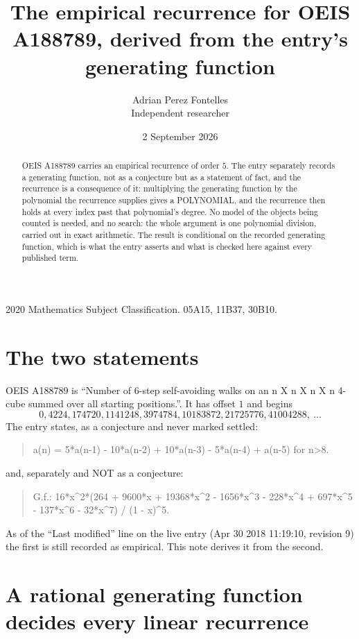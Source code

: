 \documentclass[11pt,a4paper]{article}
\title{The empirical recurrence for OEIS A188789, derived from the entry's generating function}
\author{Adrian Perez Fontelles\\ \small Independent researcher}
\date{2 September 2026}
\theoremstyle{plain}
\theoremstyle{definition}
\begin{document}
\maketitle

\begin{abstract}
OEIS A188789 carries an empirical recurrence of order $5$. The entry separately records a
generating function, not as a conjecture but as a statement of fact, and the recurrence is a
consequence of it: multiplying the generating function by the polynomial the recurrence
supplies gives a POLYNOMIAL, and the recurrence then holds at every index past that
polynomial's degree. No model of the objects being counted is needed, and no search: the
whole argument is one polynomial division, carried out in exact arithmetic. The result is
conditional on the recorded generating function, which is what the entry asserts and what is
checked here against every published term.
\end{abstract}

\noindent\small 2020 Mathematics Subject Classification. 05A15, 11B37, 30B10.\normalsize

\section{The two statements}

OEIS A188789 is ``Number of 6-step self-avoiding walks on an n X n X n X n 4-cube summed over all starting positions.''. It has offset $1$ and begins
\[
0, 4224, 174720, 1141248, 3974784, 10183872, 21725776, 41004288,\ \dots
\]
The entry states, as a conjecture and never marked settled:
\begin{quote}
a(n) = 5*a(n-1) - 10*a(n-2) + 10*a(n-3) - 5*a(n-4) + a(n-5) for n>8.
\end{quote}
and, separately and NOT as a conjecture:
\begin{quote}
G.f.: 16*x\^{}2*(264 + 9600*x + 19368*x\^{}2 - 1656*x\^{}3 - 228*x\^{}4 + 697*x\^{}5 - 137*x\^{}6 - 32*x\^{}7) / (1 - x)\^{}5.
\end{quote}
As of the ``Last modified'' line on the live entry (Apr 30 2018 11:19:10, revision 9) the first is still
recorded as empirical. This note derives it from the second.

\section{A rational generating function decides every linear recurrence}
\end{document}
